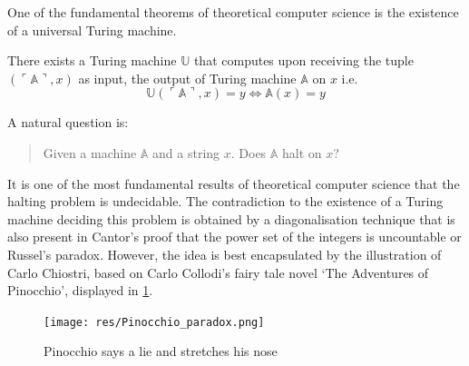 %
%

One of the fundamental theorems of theoretical computer science is the
existence of a universal Turing machine.

\begin{thm}
    There exists a Turing machine $\mathbb U$ that computes upon receiving
    the tuple $(\ulcorner \mathbb A \urcorner, x)$ as input, the output of
    Turing machine $\mathbb A$ on $x$ i.e.
    \[ \mathbb U(\ulcorner \mathbb A \urcorner, x) = y \Leftrightarrow \mathbb A (x) = y\]
\end{thm}

A natural question is:

\begin{quote}
  Given a machine $\mathbb A$ and a string $x$. Does $\mathbb A$
  halt on $x$?
\end{quote}

It is one of the most fundamental results of theoretical computer
science that the halting problem is undecidable. The contradiction to the existence of a Turing machine deciding this problem is obtained by a diagonalisation technique that is also present in Cantor's proof that the power set of the integers is uncountable or Russel's paradox. However, the idea is best encapsulated by the illustration of Carlo Chiostri, based on Carlo Collodi's fairy tale novel ‘The Adventures of Pinocchio’, displayed in \cref{fig:Pinocchio}.

\begin{figure}
  \texttt{[image: res/Pinocchio\_paradox.png]}
  \caption{Pinocchio says a lie and stretches his nose}
  \label{fig:Pinocchio}
\end{figure}

